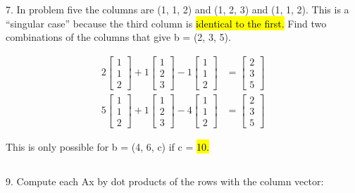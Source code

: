 \documentclass[paper=a4, fontsize=10pt]{scrartcl} %
\begin{document}
7. In problem five the columns are (1, 1, 2) and (1, 2, 3) and (1, 1, 2). This is a ``singular case'' because the third column is \hl{identical to the first.} Find two combinations of the columns that give b = (2, 3, 5).

\setcounter{equation}{0}
\begin{align}
	2
	\begin{bmatrix}
	1 \\ 1 \\ 2
	\end{bmatrix}
	+ 1
	\begin{bmatrix}
	1 \\ 2 \\ 3
	\end{bmatrix}
	- 1
	\begin{bmatrix}
	1 \\ 1 \\ 2
	\end{bmatrix}
	&=
	\begin{bmatrix}
	2 \\ 3 \\ 5
	\end{bmatrix}
	\\
	5
	\begin{bmatrix}
	1 \\ 1 \\ 2
	\end{bmatrix}
	+ 1
	\begin{bmatrix}
	1 \\ 2 \\ 3
	\end{bmatrix}
	- 4
	\begin{bmatrix}
	1 \\ 1 \\ 2
	\end{bmatrix}
	&=
	\begin{bmatrix}
	2 \\ 3 \\ 5
	\end{bmatrix}
\end{align}

This is only possible for b = (4, 6, c) if c = \hl{10.}

\subsection*{}

9. Compute each Ax by dot products of the rows with the column vector:
\end{document}
